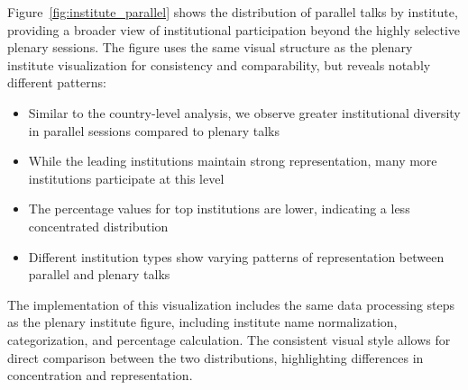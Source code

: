 \documentclass[a4paper,11pt]{article}
\begin{document}
Figure~\ref{fig:institute_parallel} shows the distribution of parallel talks by institute, providing a broader view of institutional participation beyond the highly selective plenary sessions. The figure uses the same visual structure as the plenary institute visualization for consistency and comparability, but reveals notably different patterns:

\begin{itemize}
    \item Similar to the country-level analysis, we observe greater institutional diversity in parallel sessions compared to plenary talks
    \item While the leading institutions maintain strong representation, many more institutions participate at this level
    \item The percentage values for top institutions are lower, indicating a less concentrated distribution
    \item Different institution types show varying patterns of representation between parallel and plenary talks
\end{itemize}

The implementation of this visualization includes the same data processing steps as the plenary institute figure, including institute name normalization, categorization, and percentage calculation. The consistent visual style allows for direct comparison between the two distributions, highlighting differences in concentration and representation.

\clearpage %
\end{document}
